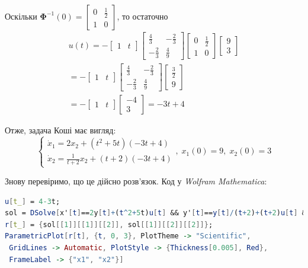 \documentclass[oneside,solution]{karazin-control-assign}
\begin{document}
Оскільки $\boldsymbol{\Phi}^{-1}(0)=\begin{bmatrix}
    0 & \frac{1}{2} \\ 1 & 0
\end{bmatrix}$, то остаточно
\begin{gather}
    u(t) = -\begin{bmatrix}
        1 & t
    \end{bmatrix}\begin{bmatrix}
        \frac{4}{3} & -\frac{2}{3} \\ -\frac{2}{3} & \frac{4}{9}
    \end{bmatrix}\begin{bmatrix}
        0 & \frac{1}{2} \\ 1 & 0
    \end{bmatrix}\begin{bmatrix}
        9 \\ 3
    \end{bmatrix} \nonumber \\
    = -\begin{bmatrix}
        1 & t
    \end{bmatrix}\begin{bmatrix}
        \frac{4}{3} & -\frac{2}{3} \\ -\frac{2}{3} & \frac{4}{9}
    \end{bmatrix}\begin{bmatrix}
        \frac{3}{2} \\ 9
    \end{bmatrix} \nonumber \\
    = -\begin{bmatrix}
        1 & t
    \end{bmatrix}\begin{bmatrix}
        -4 \\ 3
    \end{bmatrix} = \boxed{-3t+4}
\end{gather}

Отже, задача Коші має вигляд:
\begin{equation}
    \begin{cases}
        \dot{x}_1 = 2x_2 + (t^2+5t)(-3t+4) \\
        \dot{x}_2 = \frac{1}{t+2}x_2 + (t+2)(-3t+4)
    \end{cases}, \; x_1(0) = 9, \; x_2(0) = 3
\end{equation}

Знову перевіримо, що це дійсно розв'язок. Код у \textit{Wolfram Mathematica}:
\begin{lstlisting}[language=Mathematica]
u[t_] = 4-3t;
sol = DSolve[x'[t]==2y[t]+(t^2+5t)u[t] && y'[t]==y[t]/(t+2)+(t+2)u[t] && x[0]==9 && y[0]==3, {x[t], y[t]}, t];
r[t_] = {sol[[1]][[1]][[2]], sol[[1]][[2]][[2]]};
ParametricPlot[r[t], {t, 0, 3}, PlotTheme -> "Scientific", 
 GridLines -> Automatic, PlotStyle -> {Thickness[0.005], Red}, 
 FrameLabel -> {"x1", "x2"}]
\end{lstlisting}
\end{document}

